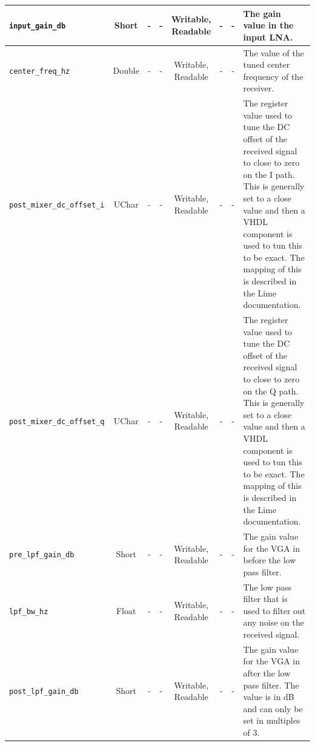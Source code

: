 \documentclass{article}
\begin{document}
\begin{landscape}
\begin{scriptsize}
\begin{tabular}{|p{3cm}|c|c|c|c|c|c|p{10cm}|}
			\hline
			\verb+input_gain_db+          & Short  & -        & -          & Writable, Readable  & -     & -       & The gain value in the input LNA.                                                                                                                                                                                                                                   \\
			\hline
			\verb+center_freq_hz+         & Double & -        & -          & Writable, Readable  & -     & -       & The value of the tuned center frequency of the receiver.                                                                                                                                                                                                           \\
			\hline
			\verb+post_mixer_dc_offset_i+ & UChar  & -        & -          & Writable, Readable  & -     & -       & The register value used to tune the DC offset of the received signal to close to zero on the I path. This is generally set to a close value and then a VHDL component is used to tun this to be exact. The mapping of this is described in the Lime documentation. \\
			\hline
			\verb+post_mixer_dc_offset_q+ & UChar  & -        & -          & Writable, Readable  & -     & -       & The register value used to tune the DC offset of the received signal to close to zero on the Q path. This is generally set to a close value and then a VHDL component is used to tun this to be exact. The mapping of this is described in the Lime documentation. \\
			\hline
			\verb+pre_lpf_gain_db+        & Short  & -        & -          & Writable, Readable  & -     & -       & The gain value for the VGA in before the low pass filter.                                                                                                                                                                                                          \\
			\hline
			\verb+lpf_bw_hz+              & Float  & -        & -          & Writable, Readable  & -     & -       & The low pass filter that is used to filter out any noise on the received signal.                                                                                                                                                                                   \\
			\hline
			\verb+post_lpf_gain_db+       & Short  & -        & -          & Writable, Readable  & -     & -       & The gain value for the VGA in after the low pass filter. The value is in dB and can only be set in multiples of 3.                                                                                                                                                 \\
			\hline
		\end{tabular}
	\end{scriptsize}


\end{landscape}
\end{document}
